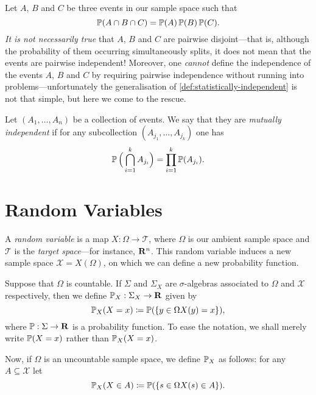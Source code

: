 \begin{remark}
\label{rem:event-independence}
Let \(A\), \(B\) and \(C\) be three events in our sample space such that
\[
\operatorname{\mathbb{P}}(A \cap B \cap C) = \operatorname{\mathbb{P}}(A) \operatorname{\mathbb{P}}(B) \operatorname{\mathbb{P}}(C).
\]
\emph{It is not necessarily true} that \(A\), \(B\) and \(C\) are pairwise
disjoint---that is, although the probability of them occurring simultaneously
splits, it does not mean that the events are pairwise independent! Moreover, one
\emph{cannot} define the independence of the events \(A\), \(B\) and \(C\) by
requiring pairwise independence without running into problems---unfortunately
the generalisation of \cref{def:statistically-independent} is not that simple,
but here we come to the rescue.
\end{remark}

\begin{definition}
\label{def:mutually-independent-events}
Let \((A_1, \dots, A_n)\) be a collection of events. We say that they are
\emph{mutually independent} if for any subcollection \((A_{j_1}, \dots,
A_{j_k})\) one has
\[
\operatorname{\mathbb{P}} \Big(\bigcap_{i=1}^k A_{j_i}\Big) = \prod_{i=1}^k \operatorname{\mathbb{P}}(A_{j_i}).
\]
\end{definition}

\section{Random Variables}

\begin{definition}
\label{def:random-variable}
A \emph{random variable} is a map \(X: \Omega \to \mathcal{T}\), where
\(\Omega\) is our ambient sample space and \(\mathcal{T}\) is the \emph{target
  space}---for instance, \(\mathbf{R}^n\). This random variable induces a new sample space
\(\mathcal{X} = X(\Omega)\), on which we can define a new probability function.

Suppose that \(\Omega\) is countable. If \(\Sigma\) and \(\Sigma_X\) are
\(\sigma\)-algebras associated to \(\Omega\) and \(\mathcal{X}\) respectively,
then we define \(\operatorname{\mathbb{P}}_X: \Sigma_X \to \mathbf{R}\) given by
\[
\operatorname{\mathbb{P}}_X(X = x) \coloneq \operatorname{\mathbb{P}}(\{y \in \Omega \relax X(y) = x\}),
\]
where \(\operatorname{\mathbb{P}}: \Sigma \to \mathbf{R}\) is a probability function. To ease the notation,
we shall merely write \(\operatorname{\mathbb{P}}(X = x)\) rather than \(\operatorname{\mathbb{P}}_X(X = x)\).

Now, if \(\Omega\) is an uncountable sample space, we define \(\operatorname{\mathbb{P}}_X\) as
follows: for any \(A \subseteq \mathcal{X}\) let
\[
\operatorname{\mathbb{P}}_X(X \in A) \coloneq \operatorname{\mathbb{P}}(\{s \in \Omega \relax X(s) \in A\}).
\]
\end{definition}

